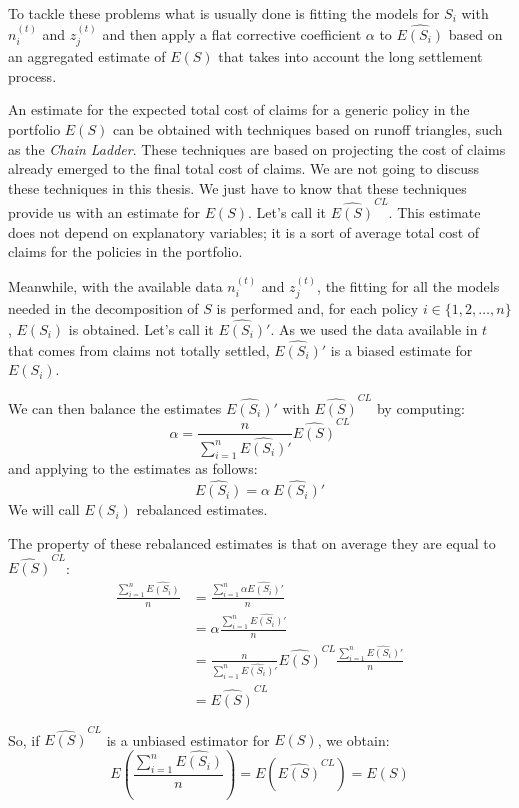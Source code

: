 \documentclass[a4paper, twoside, openright, 12pt]{report}
\theoremstyle{definition}
\theoremstyle{definition}
\theoremstyle{definition}
\theoremstyle{remark}
\begin{document}
To tackle these problems what is usually done is fitting the models for \(S_i\) with \(n_i^{(t)}\) and \(z_j^{(t)}\) and then apply a flat corrective coefficient \(\alpha\) to \(\widehat{E(S_i)}\) based on an aggregated estimate of \(E(S)\) that takes into account the long settlement process.

An estimate for the expected total cost of claims for a generic policy in the portfolio \(E(S)\) can be obtained with techniques based on runoff triangles, such as the \emph{Chain Ladder}. These techniques are based on projecting the cost of claims already emerged to the final total cost of claims. We are not going to discuss these techniques in this thesis. We just have to know that these techniques provide us with an estimate for \(E(S)\). Let's call it \(\widehat{E(S)}^{CL}\). This estimate does not depend on explanatory variables; it is a sort of average total cost of claims for the policies in the portfolio.

Meanwhile, with the available data \(n_i^{(t)}\) and \(z_j^{(t)}\), the fitting for all the models needed in the decomposition of \(S\) is performed and, for each policy \(i\in\{1, 2, \dots, n\}\), \(E(S_i)\) is obtained. Let's call it \(\widehat{E(S_i)}'\). As we used the data available in \(t\) that comes from claims not totally settled, \(\widehat{E(S_i)}'\) is a biased estimate for \(E(S_i)\).

We can then balance the estimates \(\widehat{E(S_i)}'\) with \(\widehat{E(S)}^{CL}\) by computing:
\[
\alpha = \frac{n}{\sum_{i=1}^{n}{\widehat{E(S_i)}'}} \widehat{E(S)}^{CL}
\]
and applying to the estimates as follows:
\[
\widehat{E(S_i)} = \alpha \ \widehat{E(S_i)}'
\]
We will call \(\widehat{E(S_i)}\) rebalanced estimates.

The property of these rebalanced estimates is that on average they are equal to \(\widehat{E(S)}^{CL}\):
\begin{align*}
\frac{\sum_{i=1}^{n}{\widehat{E(S_i)}}}{n} & = \frac{\sum_{i=1}^{n}{\alpha\widehat{E(S_i)}'}}{n} \\
& = \alpha\frac{\sum_{i=1}^{n}{\widehat{E(S_i)}'}}{n} \\
& = \frac{n}{\sum_{i=1}^{n}{\widehat{E(S_i)}'}} \widehat{E(S)}^{CL} \frac{\sum_{i=1}^{n}{\widehat{E(S_i)}'}}{n} \\
& = \widehat{E(S)}^{CL}
\end{align*}

So, if \(\widehat{E(S)}^{CL}\) is a unbiased estimator for \(E(S)\), we obtain:
\[
E\left( \frac{\sum_{i=1}^{n}{\widehat{E(S_i)}}}{n} \right)
= E\left( \widehat{E(S)}^{CL} \right)
= E(S)
\]
\end{document}
